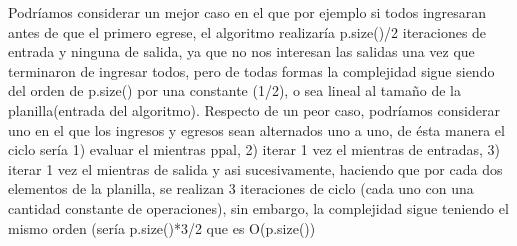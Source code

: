 \newline
Podríamos considerar un mejor caso en el que por ejemplo si  todos ingresaran antes de que el primero egrese, el algoritmo realizaría p.size()/2 iteraciones de entrada y ninguna de salida, ya que no nos interesan las salidas una vez que terminaron de ingresar todos, pero de todas formas la complejidad sigue siendo del orden de p.size() por una constante (1/2), o sea lineal al tamaño de la planilla(entrada del algoritmo).
\newline 
Respecto de un peor caso, podríamos considerar uno en el que los ingresos y egresos sean alternados uno a uno, de ésta manera el ciclo sería  1) evaluar el mientras ppal, 2)  iterar 1 vez  el mientras de entradas, 3) iterar 1 vez el mientras de salida  y asi sucesivamente, haciendo que  por cada dos elementos de la planilla, se realizan 3 iteraciones de ciclo (cada uno con una cantidad constante de operaciones), sin embargo, la complejidad sigue teniendo el mismo orden (sería p.size()*3/2 que es O(p.size())
